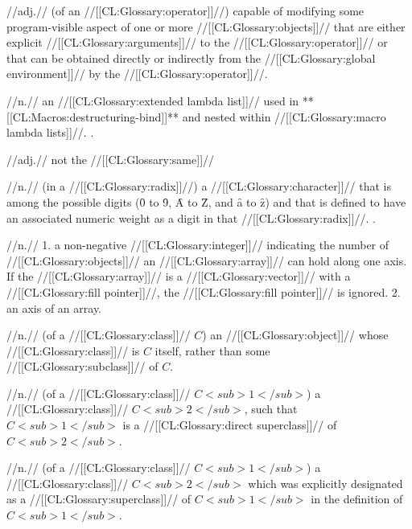  //adj.// (of an //[[CL:Glossary:operator]]//) capable of modifying some program-visible aspect of one or more //[[CL:Glossary:objects]]// that are either explicit //[[CL:Glossary:arguments]]// to the //[[CL:Glossary:operator]]// or that can be obtained directly or indirectly from the //[[CL:Glossary:global environment]]// by the //[[CL:Glossary:operator]]//.

 //n.// an //[[CL:Glossary:extended lambda list]]// used in **[[CL:Macros:destructuring-bind]]** and nested within //[[CL:Glossary:macro lambda lists]]//. \Seesection\DestructuringLambdaLists.

 //adj.// not the //[[CL:Glossary:same]]// 

 //n.// (in a //[[CL:Glossary:radix]]//) a //[[CL:Glossary:character]]// that is among the possible digits (\f{0} to \f{9}, \f{A} to \f{Z}, and \f{a} to \f{z}) and that is defined to have an associated numeric weight as a digit in that //[[CL:Glossary:radix]]//. \Seesection\Digits.

 //n.// 1. a non-negative //[[CL:Glossary:integer]]// indicating the number of //[[CL:Glossary:objects]]// an //[[CL:Glossary:array]]// can hold along one axis. If the //[[CL:Glossary:array]]// is a //[[CL:Glossary:vector]]// with a //[[CL:Glossary:fill pointer]]//, the //[[CL:Glossary:fill pointer]]// is ignored.  2. an axis of an array. 
 
 //n.// (of a //[[CL:Glossary:class]]// $C$) an //[[CL:Glossary:object]]// whose //[[CL:Glossary:class]]// is $C$ itself, rather than some //[[CL:Glossary:subclass]]// of $C$. 

 //n.// (of a //[[CL:Glossary:class]]// $C<sub>1</sub>$) a //[[CL:Glossary:class]]// $C<sub>2</sub>$, such that $C<sub>1</sub>$ is a //[[CL:Glossary:direct superclass]]// of $C<sub>2</sub>$.

 //n.// (of a //[[CL:Glossary:class]]// $C<sub>1</sub>$) a //[[CL:Glossary:class]]// $C<sub>2</sub>$ which was explicitly designated as a //[[CL:Glossary:superclass]]// of $C<sub>1</sub>$ in the definition of $C<sub>1</sub>$.

